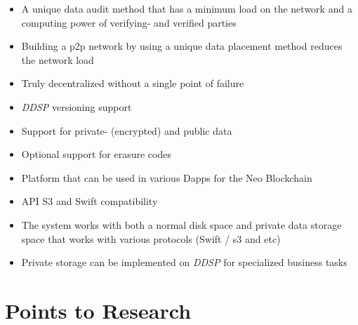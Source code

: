 \documentclass[a4paper, 11pt]{article}
\begin{document}
\begin{itemize}
    \item A unique data audit method that has a minimum load on the network
      and a computing power of verifying- and verified parties

    \item Building a p2p network by using a unique data placement method
      reduces the network load

    \item Truly decentralized without a single point of failure

    \item \textit{DDSP} versioning support

    \item Support for private- (encrypted) and public data

    \item Optional support for erasure codes

    \item Platform that can be used in various Dapps for the Neo Blockchain

    \item API S3 and Swift compatibility

    \item The system works with both a normal disk space and private data
      storage space that works with various protocols (Swift / s3 and etc)

    \item Private storage can be implemented on \textit{DDSP} for specialized business tasks

\end{itemize}

\vspace{2mm}

\section{Points to Research}
\end{document}
